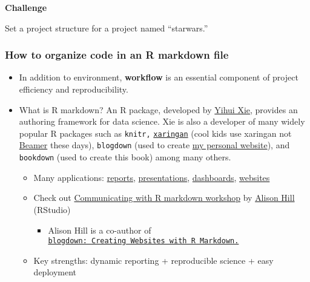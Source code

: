 \documentclass[
]{book}
\providecommand{\tightlist}{%
  \setlength{\itemsep}{0pt}\setlength{\parskip}{0pt}}
\begin{document}
\textbf{Challenge}

Set a project structure for a project named ``starwars.''

\hypertarget{how-to-organize-code-in-an-r-markdown-file}{%
\subsubsection{How to organize code in an R markdown file}\label{how-to-organize-code-in-an-r-markdown-file}}

\begin{itemize}
\item
  In addition to environment, \textbf{workflow} is an essential component of project efficiency and reproducibility.
\item
  What is R markdown? An R package, developed by \href{https://yihui.org/en/}{Yihui Xie}, provides an authoring framework for data science. Xie is also a developer of many widely popular R packages such as \texttt{knitr,} \href{https://GitHub.com/yihui/xaringan}{\texttt{xaringan}} (cool kids use xaringan not \href{https://en.wikipedia.org/wiki/Beamer_(LaTeX)}{Beamer} these days), \texttt{blogdown} (used to create \href{https://jaeyk.GitHub.io/}{my personal website}), and \texttt{bookdown} (used to create this book) among many others.

  \begin{itemize}
  \tightlist
  \item
    Many applications: \href{https://rstudio.GitHub.io/distill/basics.html}{reports}, \href{https://bookdown.org/yihui/rmarkdown/xaringan.html}{presentations}, \href{https://rmarkdown.rstudio.com/flexdashboard/}{dashboards}, \href{https://bookdown.org/yihui/rmarkdown/websites.html}{websites}\\
  \item
    Check out \href{https://ysc-rmarkdown.netlify.app/}{Communicating with R markdown workshop} by \href{https://alison.rbind.io/}{Alison Hill} (RStudio)

    \begin{itemize}
    \tightlist
    \item
      Alison Hill is a co-author of \href{https://bookdown.org/yihui/blogdown/}{\texttt{blogdown:\ Creating\ Websites\ with\ R\ Markdown.}}
    \end{itemize}
  \item
    Key strengths: dynamic reporting + reproducible science + easy deployment
  \end{itemize}
\end{itemize}
\end{document}
